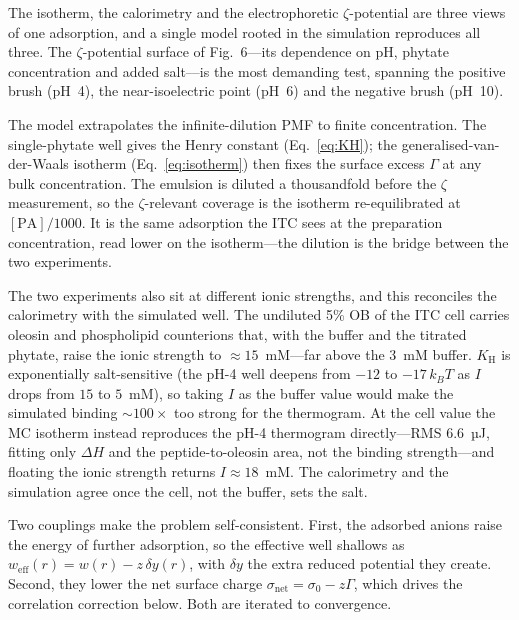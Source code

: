 \documentclass[11pt]{article}
\begin{document}
The isotherm, the calorimetry and the electrophoretic $\zeta$-potential are three
views of one adsorption, and a single model rooted in the simulation reproduces
all three.  The $\zeta$-potential surface of Fig.~6---its dependence on pH,
phytate concentration and added salt---is the most demanding test, spanning the
positive brush (pH~4), the near-isoelectric point (pH~6) and the negative brush
(pH~10).

The model extrapolates the infinite-dilution PMF to finite concentration.  The
single-phytate well gives the Henry constant (Eq.~\ref{eq:KH}); the
generalised-van-der-Waals isotherm (Eq.~\ref{eq:isotherm}) then fixes the surface
excess $\Gamma$ at any bulk concentration.  The emulsion is diluted a
thousandfold before the $\zeta$ measurement, so the $\zeta$-relevant coverage is
the isotherm re-equilibrated at $[\text{PA}]/1000$.  It is the same adsorption the
ITC sees at the preparation concentration, read lower on the isotherm---the
dilution is the bridge between the two experiments.

The two experiments also sit at different ionic strengths, and this reconciles the
calorimetry with the simulated well.  The undiluted 5\% OB of the ITC cell carries
oleosin and phospholipid counterions that, with the buffer and the titrated
phytate, raise the ionic strength to $\approx15$~mM---far above the $3$~mM buffer.
$K_\text{H}$ is exponentially salt-sensitive (the pH-4 well deepens from $-12$ to
$-17\,k_BT$ as $I$ drops from $15$ to $5$~mM), so taking $I$ as the buffer value
would make the simulated binding $\sim\!100\times$ too strong for the thermogram.
At the cell value the MC isotherm instead reproduces the pH-4 thermogram
directly---RMS $6.6$~µJ, fitting only $\Delta H$ and the peptide-to-oleosin area,
not the binding strength---and floating the ionic strength returns $I\approx18$~mM.
The calorimetry and the simulation agree once the cell, not the buffer, sets the
salt.

Two couplings make the problem self-consistent.  First, the adsorbed anions raise
the energy of further adsorption, so the effective well shallows as
$w_\text{eff}(r)=w(r)-z\,\delta y(r)$, with $\delta y$ the extra reduced potential
they create.  Second, they lower the net surface charge
$\sigma_\text{net}=\sigma_0-z\Gamma$, which drives the correlation correction
below.  Both are iterated to convergence.
\end{document}
